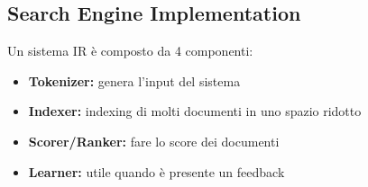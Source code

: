 \newpage

\subsection{Search Engine Implementation}
Un sistema IR è composto da 4 componenti: 
\begin{itemize}
    \item \textbf{Tokenizer:} genera l'input del sistema
    \item \textbf{Indexer:} indexing di molti documenti in uno spazio ridotto
    \item \textbf{Scorer/Ranker:} fare lo score dei documenti
    \item \textbf{Learner:} utile quando è presente un feedback
\end{itemize}

